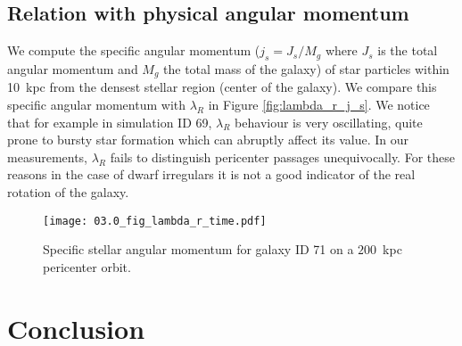 

\subsection{Relation with physical angular momentum}
We compute the specific angular momentum ($j_s = J_s/M_g$ where $J_s$ is the total angular momentum and $M_g$ the total mass of the galaxy) of star particles within 10~kpc from the densest stellar region (center of the galaxy).
We compare this specific angular momentum with $\lambda_R$ in Figure \ref{fig:lambda_r_j_s}.
We notice that for example in simulation ID 69, $\lambda_R$ behaviour is very oscillating, quite prone to bursty star formation which can abruptly affect its value.
In our measurements, $\lambda_R$ fails to distinguish pericenter passages unequivocally.
For these reasons in the case of dwarf irregulars it is not a good indicator of the real rotation of the galaxy.

\begin{figure}
\centering
\texttt{[image: 03.0\_fig\_lambda\_r\_time.pdf]}
\caption{Specific stellar angular momentum for galaxy ID 71 on a $200$~kpc pericenter orbit.}
\label{fig:lambda_R}
\end{figure}

\section{Conclusion}


% 

